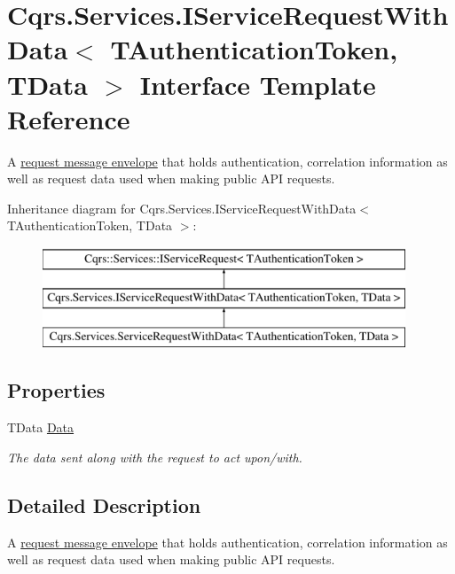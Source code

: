 \hypertarget{interfaceCqrs_1_1Services_1_1IServiceRequestWithData}{}\section{Cqrs.\+Services.\+I\+Service\+Request\+With\+Data$<$ T\+Authentication\+Token, T\+Data $>$ Interface Template Reference}
\label{interfaceCqrs_1_1Services_1_1IServiceRequestWithData}


A \hyperlink{}{request message envelope} that holds authentication, correlation information as well as request data used when making public A\+PI requests.  


Inheritance diagram for Cqrs.\+Services.\+I\+Service\+Request\+With\+Data$<$ T\+Authentication\+Token, T\+Data $>$\+:\begin{figure}[H]
\begin{center}
\leavevmode
\includegraphics[height=3.000000cm]{interfaceCqrs_1_1Services_1_1IServiceRequestWithData}
\end{center}
\end{figure}
\subsection*{Properties}
\begin{DoxyCompactItemize}
\item 
T\+Data \hyperlink{interfaceCqrs_1_1Services_1_1IServiceRequestWithData_a6d2d68c5e99b9be14d2a0ee800eb87f3_a6d2d68c5e99b9be14d2a0ee800eb87f3}{Data}
\begin{DoxyCompactList}\small\item\em The data sent along with the request to act upon/with. \end{DoxyCompactList}\end{DoxyCompactItemize}


\subsection{Detailed Description}
A \hyperlink{}{request message envelope} that holds authentication, correlation information as well as request data used when making public A\+PI requests. 


